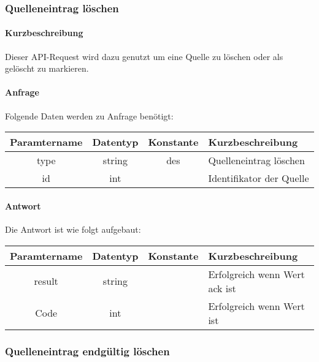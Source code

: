 \subsubsection{Quelleneintrag löschen}
\paragraph{Kurzbeschreibung}Dieser API-Request wird dazu genutzt um eine Quelle zu löschen oder als gelöscht zu markieren.
\paragraph{Anfrage}Folgende Daten werden zu Anfrage benötigt:
\begin{table}[H]
	\begin{tabular}{|c|c|c|p{6.5cm}|}
		\hline
		\textbf{Paramtername} & \textbf{Datentyp} & \textbf{Konstante} & \textbf{Kurzbeschreibung}                                                                                               \\ \hline
		type                & string            & des                & Quelleneintrag löschen \\ \hline
		id                  & int               &                    & Identifikator der Quelle \\ \hline
	\end{tabular}
\end{table}
\paragraph{Antwort}Die Antwort ist wie folgt aufgebaut:
\begin{table}[H]
	\begin{tabular}{|c|c|c|p{6.5cm}|}
		\hline
		\textbf{Paramtername} & \textbf{Datentyp} & \textbf{Konstante} & \textbf{Kurzbeschreibung}                                                                                               \\ \hline
		result              & string           &                 & Erfolgreich wenn Wert {\glqq ack\grqq} ist \\ \hline
		Code                & int              &                 & Erfolgreich wenn Wert {\glqq 0\grqq} ist \\ \hline
	\end{tabular}
\end{table}
\subsubsection{Quelleneintrag endgültig löschen}
